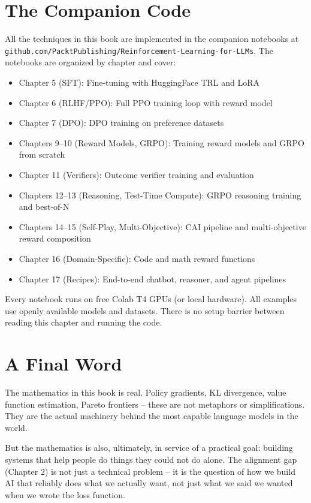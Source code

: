 \begin{chapterenv}
\section{The Companion Code}

All the techniques in this book are implemented in the companion notebooks at \texttt{github.com/PacktPublishing/Reinforcement-Learning-for-LLMs}. The notebooks are organized by chapter and cover:

\begin{itemize}
\item Chapter 5 (SFT): Fine-tuning with HuggingFace TRL and LoRA
\item Chapter 6 (RLHF/PPO): Full PPO training loop with reward model
\item Chapter 7 (DPO): DPO training on preference datasets
\item Chapters 9--10 (Reward Models, GRPO): Training reward models and GRPO from scratch
\item Chapter 11 (Verifiers): Outcome verifier training and evaluation
\item Chapters 12--13 (Reasoning, Test-Time Compute): GRPO reasoning training and best-of-N
\item Chapters 14--15 (Self-Play, Multi-Objective): CAI pipeline and multi-objective reward composition
\item Chapter 16 (Domain-Specific): Code and math reward functions
\item Chapter 17 (Recipes): End-to-end chatbot, reasoner, and agent pipelines
\end{itemize}

Every notebook runs on free Colab T4 GPUs (or local hardware). All examples use openly available models and datasets. There is no setup barrier between reading this chapter and running the code.

\section{A Final Word}

The mathematics in this book is real. Policy gradients, KL divergence, value function estimation, Pareto frontiers -- these are not metaphors or simplifications. They are the actual machinery behind the most capable language models in the world.

But the mathematics is also, ultimately, in service of a practical goal: building systems that help people do things they could not do alone. The alignment gap (Chapter 2) is not just a technical problem -- it is the question of how we build AI that reliably does what we actually want, not just what we said we wanted when we wrote the loss function.


\end{chapterenv}
